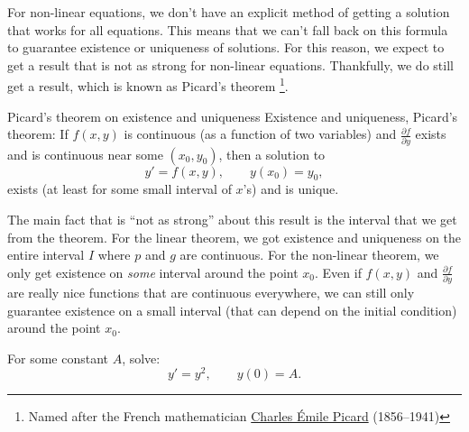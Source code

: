 \documentclass{ximera}
\begin{document}
For non-linear equations, we don't have an explicit method of getting a solution that works for all equations. This means that we can't fall back on this formula to guarantee existence or uniqueness of solutions. For this reason, we expect to get a result that is not as strong for non-linear equations. Thankfully, we do still get a result, which is known as Picard's theorem%
\footnote{Named after the French mathematician \href{https://en.wikipedia.org/wiki/Charles_\%C3\%89mile_Picard}{Charles \'Emile Picard} (1856--1941)}. 

\begin{theorem}{Picard's theorem on existence and uniqueness}%
    Existence and uniqueness, Picard's theorem: If $f(x,y)$ is continuous (as a function of two variables) and $\frac{\partial f}{\partial y}$ exists and is continuous near some $(x_0,y_0)$, then a solution to
    \begin{equation*}
        y' = f(x,y), \qquad y(x_0) = y_0,
    \end{equation*}
    exists (at least for some small interval of $x$'s) and is unique.
\end{theorem}

The main fact that is ``not as strong'' about this result is the interval that we get from the theorem. For the linear theorem, we got existence and uniqueness on the entire interval $I$ where $p$ and $g$ are continuous. For the non-linear theorem, we only get existence on \emph{some} interval around the point $x_0$. Even if $f(x,y)$ and $\frac{\partial f}{\partial y}$ are really nice functions that are continuous everywhere, we can still only guarantee existence on a small interval (that can depend on the initial condition) around the point $x_0$. 

\begin{example}
    For some constant $A$, solve:
    \begin{equation*}
        y' = y^2, \qquad y(0) = A .
    \end{equation*}
\end{example}
\end{document}
